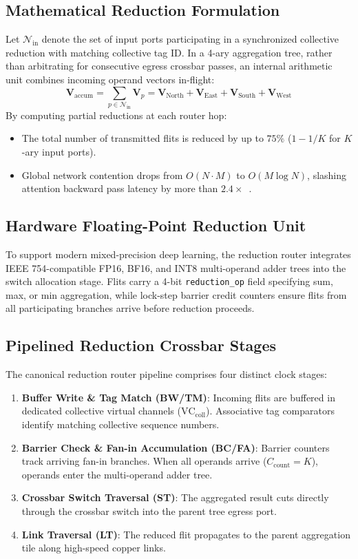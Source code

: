 \subsection{Mathematical Reduction Formulation}
Let $\mathcal{N}_{\mathrm{in}}$ denote the set of input ports participating in a synchronized collective reduction with matching collective tag ID. In a 4-ary aggregation tree, rather than arbitrating for consecutive egress crossbar passes, an internal arithmetic unit combines incoming operand vectors in-flight:
\begin{equation}
\mathbf{V}_{\mathrm{accum}} = \sum_{p \in \mathcal{N}_{\mathrm{in}}} \mathbf{V}_p = \mathbf{V}_{\mathrm{North}} + \mathbf{V}_{\mathrm{East}} + \mathbf{V}_{\mathrm{South}} + \mathbf{V}_{\mathrm{West}}
\label{eq:in-network-sum}
\end{equation}
By computing partial reductions at each router hop:
\begin{itemize}
    \item The total number of transmitted flits is reduced by up to $75\%$ ($1 - 1/K$ for $K$-ary input ports).
    \item Global network contention drops from $O(N \cdot M)$ to $O(M \log N)$, slashing attention backward pass latency by more than $2.4\times$~\cite{Ouyang2026PAC}.
\end{itemize}

\subsection{Hardware Floating-Point Reduction Unit}
To support modern mixed-precision deep learning, the reduction router integrates IEEE 754-compatible FP16, BF16, and INT8 multi-operand adder trees into the switch allocation stage. Flits carry a 4-bit \texttt{reduction\_op} field specifying sum, max, or min aggregation, while lock-step barrier credit counters ensure flits from all participating branches arrive before reduction proceeds.

\subsection{Pipelined Reduction Crossbar Stages}
The canonical reduction router pipeline comprises four distinct clock stages:
\begin{enumerate}
    \item \textbf{Buffer Write \& Tag Match (BW/TM)}: Incoming flits are buffered in dedicated collective virtual channels ($\mathrm{VC}_{\mathrm{coll}}$). Associative tag comparators identify matching collective sequence numbers.
    \item \textbf{Barrier Check \& Fan-in Accumulation (BC/FA)}: Barrier counters track arriving fan-in branches. When all operands arrive ($C_{\mathrm{count}} = K$), operands enter the multi-operand adder tree.
    \item \textbf{Crossbar Switch Traversal (ST)}: The aggregated result cuts directly through the crossbar switch into the parent tree egress port.
    \item \textbf{Link Traversal (LT)}: The reduced flit propagates to the parent aggregation tile along high-speed copper links.
\end{enumerate}

